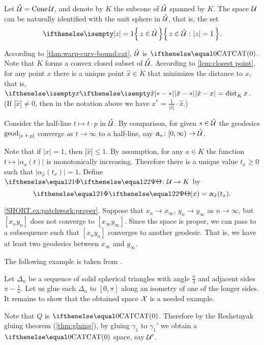 Let $\mathring{\mathcal{U}}=\mathop{\rm Cone}\nolimits \mathcal{U}$, and 
denote by $\mathring{K}$ the subcone of $\mathring{\mathcal{U}}$ spanned by $K$.
The space $\mathcal{U}$ can be naturally identified with the unit sphere in $\mathring{\mathcal{U}}$, 
that is, the set 
\[\set{z\in \mathring{\spc{U}}}{|z|=1}.\]

According to \ref{thm:warp-curv-bound:cat}, $\mathring{\mathcal{U}}$ is $\CAT0$.
Note that $\mathring{K}$ forms a convex closed subset of $\mathring{\mathcal{U}}$.
According to \ref{lem:closest point}, for any point $x$ there is a unique point $\hat x\in \mathring{K}$
that minimizes the distance to $x$,
that is, $\dist{\hat x}{x}{}=\distfun{K}{x}{}$.
(If $|\hat x|\ne0$, then in the notation above we have
$x^*=\tfrac1{|\hat x|}\cdot\hat x$.)

Consider the half-line $t\mapsto t\cdot p$ in  $\mathring{\mathcal{U}}$.
By comparison, 
for given $s\in \mathring{\spc{U}}$
the geodesics $\geod_{[s\ t\cdot p]}$ converge as $t\to\infty$ to a half-line, 
say $\alpha_s\:[0,\infty)\to \mathring{\spc{U}}$.



Note that if $|x|=1$, then $|\hat x|\le 1$.
By assumption, for any $a\in K$ the function $t\mapsto |\alpha_a(t)|$ is monotonically increasing.
Therefore there is a unique value $t_x\ge 0$ such that
$|\alpha_{\hat x}(t_x)|=1$.
Define $\map[2]\:\spc{U}\to K$
 by 
\[\map[2](x)=\alpha_{\hat x}(t_x).\]

\parbf{\ref{ex:patchwork};} \ref{SHORT.ex:patchwork:proper}.
Suppose that $x_n\to x_\infty$, $y_n\to y_\infty$ as $n\to\infty$,
but $[x_ny_n]$ does not converge to $[x_\infty y_\infty]$.
Since the space is proper, we can pass to a subsequence such that $[x_ny_n]$ converges to another geodesic.
That is, we have at least two geodesics between $x_\infty$ and $y_\infty$.

The following example is taken from \cite[Chapter I, Exercise 3.14]{bridson-haefliger}.

Let $\Delta_n$ be a sequence of solid spherical triangles 
with angle $\tfrac\pi4$ and adjacent sides $\pi-\tfrac1n$.
Let us glue each $\Delta_n$ to $[0,\pi]$ along an isometry of one of the longer sides.
It remains to show that the obtained space $\mathcal{X}$ is a needed example.

Note that 
$Q$ 
is $\CAT0$.
Therefore by the Reshetnyak gluing theorem (\ref{thm:gluing}),
by gluing 
$\gamma_1$ 
to $\gamma_1'$ 
we obtain a $\CAT0$ space, say $\mathcal{U}'$.

